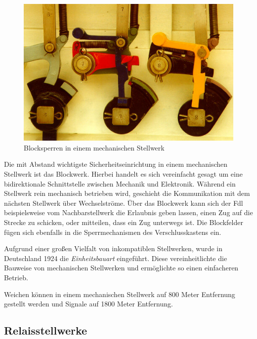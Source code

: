 \begin{figure}[H]
    \centering
    \includegraphics[width=.8\textwidth]{Assets/Images/2-Grundlagen/Mechanisches-Stellwerk-Blocksperren.jpg}
    \caption{Blocksperren in einem mechanischen Stellwerk~\cite{bib:stellwerke.de:Einheit}}\label{abb:Grundlagen:Stellwerkstechnik:Mechanische-Stellwerke:Blocksperren}
\end{figure}

Die mit Abstand wichtigste Sicherheitseinrichtung in einem mechanischen Stellwerk ist das Blockwerk. Hierbei handelt es sich vereinfacht gesagt um eine bidirektionale Schnittstelle zwischen Mechanik und Elektronik. Während ein Stellwerk rein mechanisch betrieben wird, geschieht die Kommunikation mit dem nächsten Stellwerk über Wechselströme. Über das Blockwerk kann sich der \ac{Fdl} beispielsweise vom Nachbarstellwerk die Erlaubnis geben lassen, einen Zug auf die Strecke zu schicken, oder mitteilen, dass ein Zug unterwegs ist. Die Blockfelder fügen sich ebenfalls in die Sperrmechanismen des Verschlusskastens ein.~\cite[][S.179 ff.]{bib:Sicherung-des-Schienenverkehrs}

Aufgrund einer großen Vielfalt von inkompatiblen Stellwerken, wurde in Deutschland 1924 die \textit{Einheitsbauart} eingeführt. Diese vereinheitlichte die Bauweise von mechanischen Stellwerken und ermöglichte so einen einfacheren Betrieb.~\cite[][S.173]{bib:Sicherung-des-Schienenverkehrs}

Weichen können in einem mechanischen Stellwerk auf 800 Meter Entfernung gestellt werden und Signale auf 1800 Meter Entfernung.~\cite{bib:DB:Stellwerke}

\subsection{Relaisstellwerke}\label{text:Grundlagen:Stellwerkstechnik:Relaisstellwerke}

